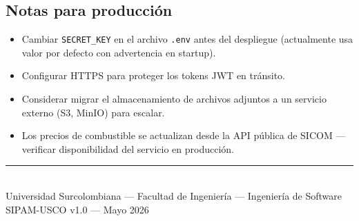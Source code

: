 \documentclass[12pt,a4paper]{article}
\begin{document}
\subsection{Notas para producción}

\begin{itemize}[leftmargin=1.5cm]
  \item Cambiar \texttt{SECRET\_KEY} en el archivo \texttt{.env} antes del despliegue (actualmente usa valor por defecto con advertencia en startup).
  \item Configurar HTTPS para proteger los tokens JWT en tránsito.
  \item Considerar migrar el almacenamiento de archivos adjuntos a un servicio externo (S3, MinIO) para escalar.
  \item Los precios de combustible se actualizan desde la API pública de SICOM — verificar disponibilidad del servicio en producción.
\end{itemize}

\vfill
\begin{center}
  {\color{vinotinto}\rule{0.5\linewidth}{0.8pt}}\\[0.3cm]
  {\small Universidad Surcolombiana — Facultad de Ingeniería — Ingeniería de Software}\\
  {\small SIPAM-USCO v1.0 — Mayo 2026}
\end{center}
\end{document}
